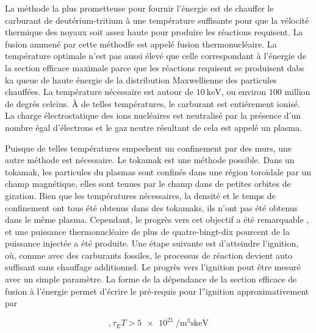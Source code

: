 \documentclass[main.tex]{subfiles}
\begin{document}
La méthode la plus prometteuse pour fournir l'énergie est de chauffer le carburant de deutérium-tritium à une température suffisante pour que la vélocité thermique des noyaux soit assez haute pour produire les réactions requisent.
La fusion ammené par cette méthodfe est appelé fusion thermonucléaire.
La température optimale n'est pas aussi élevé que celle correspondant à l'énergie de la section efficace maximale parce que les réactions requisent  se produisent dabs ka queue de haute énergie de la distribution Maxwellienne des particules chauffées.
La température nécessaire est autour de \( \SI{10}{\kilo\electronvolt} \), ou environ \( 100 \) million de degrés celcius.
À de telles températures, le carburant est entiérement ionisé.
La charge électrostatique des ions nucléaires est neutralisé par la présence d'un nombre égal d'électrons et le gaz neutre résultant de cela est appelé un plasma.

Puisque de telles températures empechent un confinement par des murs, une autre méthode est nécessaire.
Le tokamak est une méthode possible.
Dans un tokamak, les particules du plasmas sont confinés dans une région toroïdale par un champ magnétique, elles sont tenues par le champ dans de petites orbites de giration.
Bien que les températures nécessaires, la densité et le temps de confinement ont tous été obtenus dans des tokamaks, ils n'ont pas été obtenus dans le même plasma.
Cependant, le progrès vers cet objectif a été remarquable , et une puissance thermonucléaire de plus de quatre-bingt-dix pourcent de la puissance injectée a été produite.
Une étape suivante est d'atteindre l'ignition, où, comme avec des carburants fossiles, le processus de réaction devient auto suffisant sans chauffage additionnel.
Le progrès vers l'ignition pout être mesuré avec un simple paramètre.
La forme de la dépendance de la section efficace de fusion à l'énergie permet d'écrire le pré-requis pour l''ignition approximativement par

\[
	, \tau_E T > \SI{5e21}{\per\meter\cubed\second\kilo\electronvolt}
\]
\end{document}
